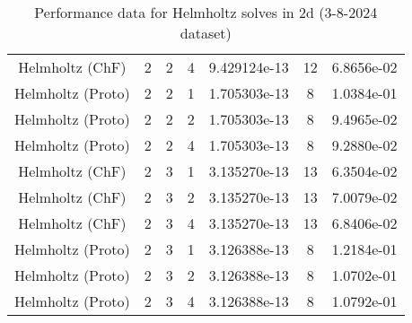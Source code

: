 \documentclass{article}
\begin{document}
\begin{small}
\begin{table}
\begin{center}
\begin{tabular}{|c|c|c|c|c|c||c|}
      Helmholtz       (ChF) & 2 & 2 & 4& 9.429124e-13 & 12 & 6.8656e-02\\
      Helmholtz     (Proto) & 2 & 2 & 1& 1.705303e-13 & 8 & 1.0384e-01\\
      Helmholtz     (Proto) & 2 & 2 & 2& 1.705303e-13 & 8 & 9.4965e-02\\
      Helmholtz     (Proto) & 2 & 2 & 4& 1.705303e-13 & 8 & 9.2880e-02\\
      \hline 
      Helmholtz       (ChF) & 2 & 3 & 1& 3.135270e-13 & 13 & 6.3504e-02\\
      Helmholtz       (ChF) & 2 & 3 & 2& 3.135270e-13 & 13 & 7.0079e-02\\
      Helmholtz       (ChF) & 2 & 3 & 4& 3.135270e-13 & 13 & 6.8406e-02\\
      Helmholtz     (Proto) & 2 & 3 & 1& 3.126388e-13 & 8 & 1.2184e-01\\
      Helmholtz     (Proto) & 2 & 3 & 2& 3.126388e-13 & 8 & 1.0702e-01\\
      Helmholtz     (Proto) & 2 & 3 & 4& 3.126388e-13 & 8 & 1.0792e-01\\
      \hline 
    \end{tabular} 
  \end{center}   
    \label{tab::datareductiontable3102024.helm_2} 
    \caption{Performance data for  Helmholtz solves in 2d (3-8-2024 dataset)}
\end{table} 
\end{small} 
\end{document}
